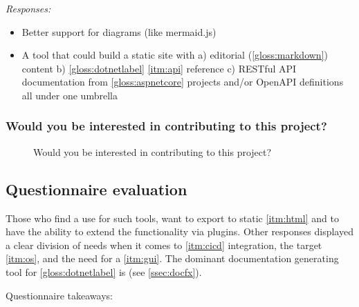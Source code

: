 \textit{Responses:}
\begin{itemize}
    \item Better support for diagrams (like mermaid.js)
    \item A tool that could build a static site with a) editorial (\ref{gloss:markdown}) content b) \ref{gloss:dotnetlabel} \ref{itm:api} reference c) RESTful API documentation from \ref{gloss:aspnetcore} projects and/or OpenAPI definitions all under one umbrella
\end{itemize}

\subsubsection*{Would you be interested in contributing to this project?}

\begin{figure}[H]
    \centering
    \caption{Would you be interested in contributing to this project?}
\end{figure}

\subsection{Questionnaire evaluation} \label{ssec:questionnaireeval}

Those who find a use for such tools, want to export to static \ref{itm:html} and to have the ability to extend the functionality via plugins.
Other responses displayed a clear division of needs when it comes to \ref{itm:cicd} integration, the target \ref{itm:os}, and the need for a \ref{itm:gui}.
The dominant documentation generating tool for \ref{gloss:dotnetlabel} is  (see \ref{ssec:docfx}).

Questionnaire takeaways:

